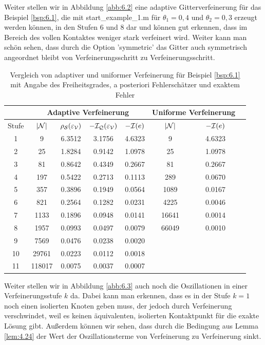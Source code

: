 \begin{bsp}
Weiter stellen wir in Abbildung \ref{abb:6.2} eine adaptive Gitterverfeinerung für das Beispiel \ref{bsp:6.1}, die mit {\ttfamily start_example_1.m} für $\theta_1 = 0,4$ und $\theta_2 = 0,3$ erzeugt werden können, in den Stufen 6 und 8 dar und können gut erkennen, dass im Bereich des vollen Kontaktes weniger stark verfeinert wird. Weiter kann man schön sehen, dass durch die Option {\ttfamily 'symmetric'} das Gitter auch symmetrisch angeordnet bleibt von Verfeinerungsschritt zu Verfeinerungsschritt.


\begin{table}[h]
\centering
\begin{tabular}[c]{|c|c|c|c|c|c|c|c|}
	\hline
	 & \multicolumn{4}{c|}{Adaptive Verfeinerung} & \multicolumn{2}{c|}{Uniforme Verfeinerung} \\
	\hline
	Stufe & $\lvert \mathcal N\rvert$ & $\rho_{\mathcal S}(\varepsilon_{\mathcal V})$ & $-\mathcal I_{\mathcal Q} (\varepsilon_{\mathcal V})$ & $-\mathcal I(e)$ & $\lvert \mathcal N\rvert$ & $-\mathcal I (e)$ \\
	\hline
	 1 &  9  & 6.3512 & 3.1756 & 4.6323 & 9  & 4.6323 \\
	 2 & 25 & 1.8284 & 0.9142 & 1.0978 & 25 & 1.0978 \\
	 3 & 81 & 0.8642 & 0.4349 & 0.2667 & 81 & 0.2667 \\
	 4 & 197 & 0.5422 &0.2713 & 0.1113 & 289 & 0.0670 \\
	 5 & 357 & 0.3896 & 0.1949 & 0.0564 & 1089 &0.0167  \\
	 6 & 821 & 0.2564 & 0.1282 & 0.0231 &4225 &  0.0046 \\
	 7 & 1133 & 0.1896 & 0.0948 & 0.0141 & 16641 & 0.0014 \\
	 8 & 1957 & 0.0993 & 0.0497 & 0.0079 & 66049 & 0.0010 \\
	 9 & 7569 & 0.0476 & 0.0238 & 0.0020 & & \\
	 10 & 29761 & 0.0223 & 0.0112 & 0.0018 & & \\
	 11 & 118017 & 0.0075 & 0.0037 & 0.0007 & & \\
	\hline
\end{tabular}
\caption[Vergleich von adaptiver und uniformer Verfeinerung für Beispiel \ref{bsp:6.1}]{\label{tab:6.1}Vergleich von adaptiver und uniformer Verfeinerung für Beispiel \ref{bsp:6.1} mit Angabe des Freiheitsgrades, a posteriori Fehlerschätzer und exaktem Fehler}
\end{table}


Weiter stellen wir in Abbildung \ref{abb:6.3} auch noch die Oszillationen in einer Verfeinerungsstufe $k$ da. Dabei kann man erkennen, dass es in der Stufe $k=1$ noch einen isolierten Knoten geben muss, der jedoch durch Verfeinerung verschwindet, weil es keinen äquivalenten, isolierten Kontaktpunkt für die exakte Lösung gibt. Außerdem können wir sehen, dass durch die Bedingung aus Lemma \ref{lem:4.24} der Wert der Oszillationsterme von Verfeinerung zu Verfeinerung sinkt.




\end{bsp}
